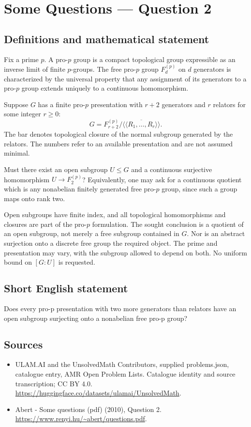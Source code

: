 \documentclass[11pt,a4paper]{article}
\begin{document}
\section*{Some Questions — Question 2}\label{statement}

\subsection{Definitions and mathematical statement}
Fix a prime $p$. A pro-$p$ group is a compact topological group expressible as an inverse limit of finite $p$-groups. The free pro-$p$ group $F_d^{(p)}$ on $d$ generators is characterized by the universal property that any assignment of its generators to a pro-$p$ group extends uniquely to a continuous homomorphism.

Suppose $G$ has a finite pro-$p$ presentation with $r+2$ generators and $r$ relators for some integer $r\geq0$:
\[
 G=F_{r+2}^{(p)}/\overline{\langle\!\langle R_1,\ldots,R_r
                            \rangle\!\rangle}.
\]
The bar denotes topological closure of the normal subgroup generated by the relators. The numbers refer to an available presentation and are not assumed minimal.

Must there exist an open subgroup $U\leq G$ and a continuous surjective homomorphism $U\to F_2^{(p)}$? Equivalently, one may ask for a continuous quotient which is any nonabelian finitely generated free pro-$p$ group, since such a group maps onto rank two.

Open subgroups have finite index, and all topological homomorphisms and closures are part of the pro-$p$ formulation. The sought conclusion is a quotient of an open subgroup, not merely a free subgroup contained in $G$. Nor is an abstract surjection onto a discrete free group the required object. The prime and presentation may vary, with the subgroup allowed to depend on both. No uniform bound on $[G:U]$ is requested.
\subsection{Short English statement}
Does every pro-p presentation with two more generators than relators have an open subgroup surjecting onto a nonabelian free pro-p group?
\subsection{Sources}
\begin{itemize}
\item[S1] ULAM.AI and the UnsolvedMath Contributors, supplied problems.json, catalogue entry, AMR Open Problem Lists. Catalogue identity and source transcription; CC BY 4.0.
\url{https://huggingface.co/datasets/ulamai/UnsolvedMath}.
\item[S2] Abert - Some questions (pdf) (2010), Question 2. 
\url{https://www.renyi.hu/~abert/questions.pdf}.
\end{itemize}
\end{document}
